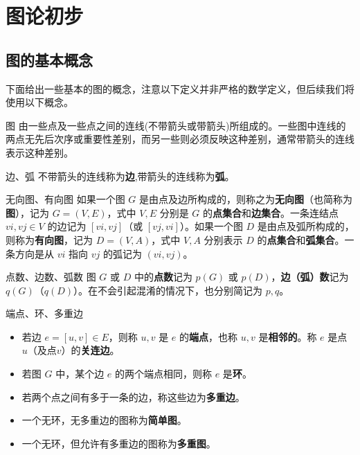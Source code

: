 \ifx\allfiles\undefined

	
	
\else
\fi
    \chapter{图论初步}
    \section{图的基本概念}
	下面给出一些基本的图的概念，注意以下定义并非严格的数学定义，但后续我们将使用以下概念。
	\begin{dfnbox}{图}{}
		由一些点及一些点之间的连线(不带箭头或带箭头)所组成的。一些图中连线的两点无先后次序或重要性差别，而另一些则必须反映这种差别，通常带箭头的连线表示这种差别。
	\end{dfnbox}
	\begin{dfnbox}{边、弧}{}
		不带箭头的连线称为\textbf{边},带箭头的连线称为\textbf{弧}。
	\end{dfnbox}
	\begin{dfnbox}{无向图、有向图}{}
		如果一个图 \( G \) 是由点及边所构成的，则称之为\textbf{无向图}（也简称为\textbf{图}），记为 \( G = (V, E) \)，式中 \( V, E \) 分别是 \( G \) 的\textbf{点集合}和\textbf{边集合}。一条连结点 \( vi, vj \in V \) 的边记为 \( [vi, vj] \)（或 \( [vj, vi] \)）。如果一个图 \( D \) 是由点及弧所构成的，则称为\textbf{有向图}，记为 \( D = (V, A) \)，式中 \( V, A \) 分别表示 \( D \) 的\textbf{点集合}和\textbf{弧集合}。一条方向是从 \( vi \) 指向 \( vj \) 的弧记为 \( (vi, vj) \)。
	\end{dfnbox}
	\begin{dfnbox}{点数、边数、弧数}{}
		图 \( G \) 或 \( D \) 中的\textbf{点数}记为 \( p(G) \) 或 \( p(D) \)，\textbf{边（弧）数}记为 \( q(G) \)（\( q(D) \)）。在不会引起混淆的情况下，也分别简记为 \( p, q \)。
	\end{dfnbox}
	\begin{dfnbox}{端点、环、多重边}{}
		\begin{itemize}
			\item 若边 \( e = [u, v] \in E \)，则称 \( u, v \) 是 \( e \) 的\textbf{端点}，也称 \( u, v \) 是\textbf{相邻的}。称 \( e \) 是点 \( u \)（及点\( v \)）的\textbf{关连边}。
			\item 若图 \( G \) 中，某个边 \( e \) 的两个端点相同，则称 \( e \) 是\textbf{环}。
			\item 若两个点之间有多于一条的边，称这些边为\textbf{多重边}。
			\item 一个无环，无多重边的图称为\textbf{简单图}。
			\item 一个无环，但允许有多重边的图称为\textbf{多重图}。
		\end{itemize}
	\end{dfnbox}
